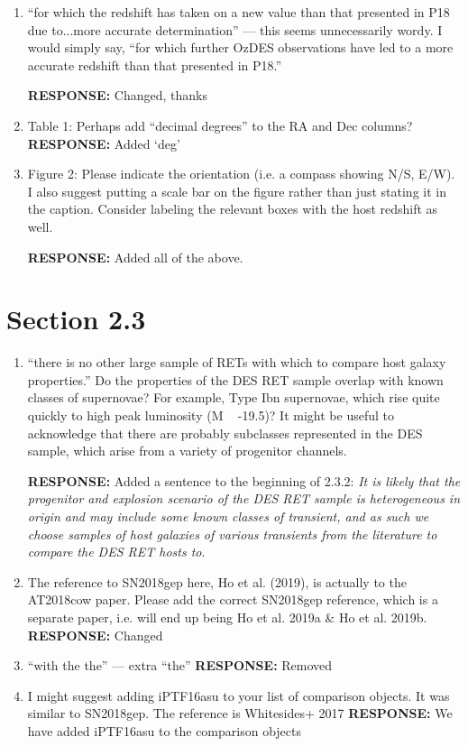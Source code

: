 \documentclass{article}
\begin{document}
\begin{enumerate}
\item  “for which the redshift has taken on a new value than that presented in P18 due to...more accurate determination” — this seems unnecessarily wordy. I would simply say, “for which further OzDES observations have led to a more accurate redshift than that presented in P18.”

\vskip0.1cm
{\bf RESPONSE: } Changed, thanks

\item[] Table 1: Perhaps add “decimal degrees” to the RA and Dec columns?
\vskip0.1cm
{\bf RESPONSE: } Added `deg' 
\item[] Figure 2: Please indicate the orientation (i.e. a compass showing N/S, E/W). I also suggest putting a scale bar on the figure rather than just stating it in the caption. Consider labeling the relevant boxes with the host redshift as well.

{\bf RESPONSE: } Added all of the above.

\end{enumerate}
\section*{Section 2.3}
\begin{enumerate}
    \item “there is no other large sample of RETs with which to compare host galaxy properties.” Do the properties of the DES RET sample overlap with known classes of supernovae? For example, Type Ibn supernovae, which rise quite quickly to high peak luminosity (M ~ -19.5)? It might be useful to acknowledge that there are probably subclasses represented in the DES sample, which arise from a variety of progenitor channels.
    
    \vskip0.1cm
    {\bf RESPONSE: } Added a sentence to the beginning of 2.3.2: \textit{It is likely that the progenitor and explosion scenario of the DES RET sample is heterogeneous in origin and may include some known classes of transient, and as such we choose samples of host galaxies of various transients from the literature to compare the DES RET hosts to}.
    
\item The reference to SN2018gep here, Ho et al. (2019), is actually to the AT2018cow paper. Please add the correct SN2018gep reference, which is a separate paper, i.e. will end up being Ho et al. 2019a \& Ho et al. 2019b.
\vskip0.1cm
 {\bf RESPONSE: } Changed
 
 \item “with the the” — extra “the”
 \vskip0.1cm
 {\bf RESPONSE: } Removed
 
 \item I might suggest adding iPTF16asu to your list of comparison objects. It was similar to SN2018gep. The reference is Whitesides+ 2017
 \vskip0.1cm
 {\bf RESPONSE: } We have added iPTF16asu to the comparison objects

\end{enumerate}
\end{document}
